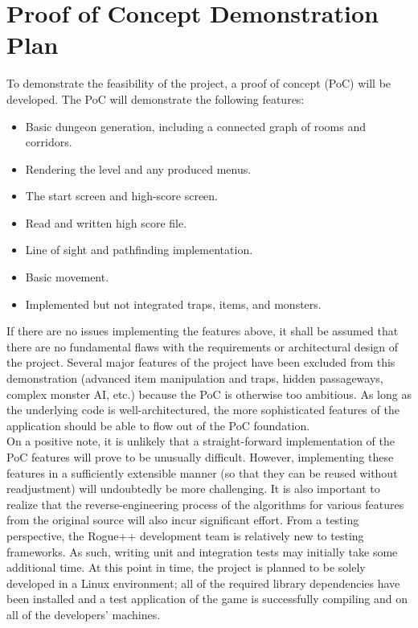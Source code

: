 \documentclass{article}
\begin{document}
\section{Proof of Concept Demonstration Plan}
\label{poc_label}

\indent
To demonstrate the feasibility of the project, a proof of concept (PoC) will be developed. The PoC will demonstrate the following features:

\begin{itemize}
	\item Basic dungeon generation, including a connected graph of rooms and corridors.
	\item Rendering the level and any produced menus.
	\item The start screen and high-score screen.
	\item Read and written high score file.
	\item Line of sight and pathfinding implementation.
	\item Basic movement.
	\item Implemented but not integrated traps, items, and monsters.
\end{itemize}

If there are no issues implementing the features above, it shall be assumed that there are no fundamental flaws with the requirements or architectural design of the project.  Several major features of the project have been excluded from this demonstration (advanced item manipulation and traps, hidden passageways, complex monster AI, etc.) because the PoC is otherwise too ambitious.  As long as the underlying code is well-architectured, the more sophisticated features of the application should be able to flow out of the PoC foundation.\\	

On a positive note, it is unlikely that a straight-forward implementation of the PoC features will prove to be unusually difficult.  However, implementing these features in a sufficiently extensible manner (so that they can be reused without readjustment) will undoubtedly be more challenging.  It is also important to realize that the reverse-engineering process of the algorithms for various features from the original source will also incur significant effort.  From a testing perspective, the Rogue++ development team is relatively new to testing frameworks.  As such, writing unit and integration tests may initially take some additional time.  At this point in time, the project is planned to be solely developed in a Linux environment; all of the required library dependencies have been installed and a test application of the game is successfully compiling and on all of the developers' machines.
\end{document}

